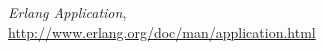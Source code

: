 \begin{thebibliography}{3}

   
 \emph{Erlang Application}, \\
   \url{http://www.erlang.org/doc/man/application.html}













\end{thebibliography}
